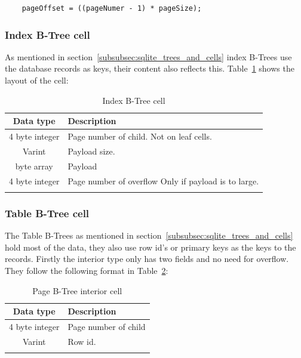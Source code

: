 \begin{lstlisting}	
	pageOffset = ((pageNumer - 1) * pageSize);
\end{lstlisting}

\subsubsection{Index B-Tree cell}
\label{subsubsec:index_btree_cell}

As mentioned in section~\ref{subsubsec:sqlite_trees_and_cells} index B-Trees use the database records as keys, their content also reflects this. Table~\ref{tbl:index_btree_cell} shows the layout of the cell:

\begin{longtable}[h]{| c | p{5cm} |}
		\hline
			\textbf{Data type} & \textbf{Description} \\ 
		\hline
		\endhead
			4 byte integer & Page number of child. \newline 
							 Not on leaf cells.\\
		\hline
			Varint & Payload size. \\
		\hline
			byte array & Payload \\
		\hline
			4 byte integer & Page number of overflow \newline
							  Only if payload is to large.\\
		\hline
	\caption{Index B-Tree cell}
	\label{tbl:index_btree_cell}
\end{longtable}

\subsubsection{Table B-Tree cell}
\label{subsubsec:table_btree_cell}

The Table B-Trees as mentioned in section~\ref{subsubsec:sqlite_trees_and_cells} hold most of the data, they also use row id's or primary keys as the keys to the records. Firstly the interior type only has two fields and no need for overflow. They follow the following format in Table~\ref{tbl:table_btree_cell_interior}: 

\begin{longtable}[h]{| c | p{5cm} |}
		\hline
			\textbf{Data type} & \textbf{Description} \\ 
		\hline
		\endhead
			4 byte integer & Page number of child \\
		\hline
			Varint & Row id. \\
		\hline
	\caption{Page B-Tree interior cell}
	\label{tbl:table_btree_cell_interior}
\end{longtable}

